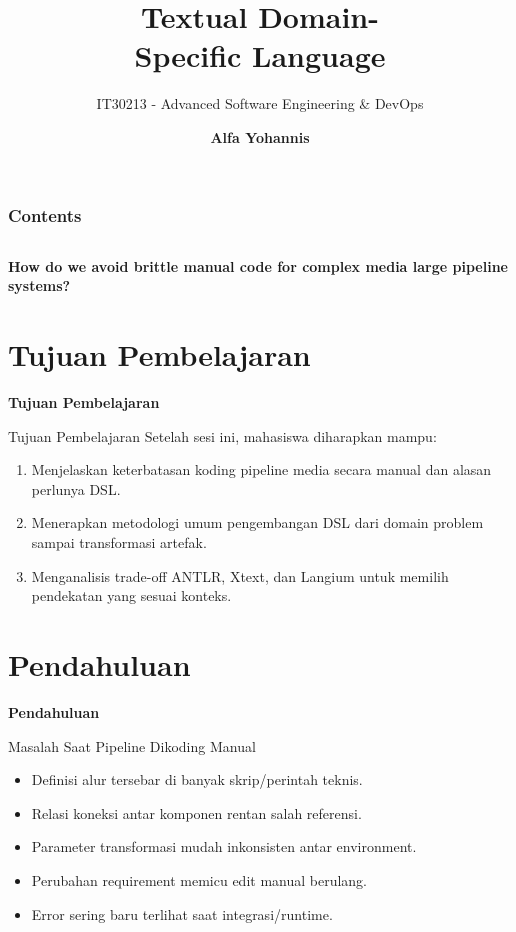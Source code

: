 \documentclass[aspectratio=169, table]{beamer}
\subtitle{IT30213 - Advanced Software Engineering \& DevOps}
\title{\Huge Textual Domain-\vspace{8pt}\\
	Specific Language}
\author{\textbf{Alfa Yohannis}}
\begin{document}
\frame{\titlepage}

\begin{frame}[fragile]
	\frametitle{Contents}
	\vspace{20pt}
	\begin{columns}[t]
		\tableofcontents[sections={1-5}]

		\tableofcontents[sections={6-9}]
	\end{columns}
\end{frame}

\begin{frame}{\hfill}
	\centering
	\Huge{\textbf{How do we avoid brittle manual code for complex media 
  large pipeline systems?}}
\end{frame}

\section{Tujuan Pembelajaran}
\begin{frame}{\hfill}
	\centering
	\Huge{\textbf{Tujuan Pembelajaran}}
\end{frame}

\begin{frame}{Tujuan Pembelajaran}
\vspace{6pt}
Setelah sesi ini, mahasiswa diharapkan mampu:
\begin{enumerate}
  \item Menjelaskan keterbatasan koding pipeline media secara manual dan alasan perlunya DSL.
  \item Menerapkan metodologi umum pengembangan DSL dari domain problem sampai transformasi artefak.
  \item Menganalisis trade-off ANTLR, Xtext, dan Langium untuk memilih pendekatan yang sesuai konteks.
\end{enumerate}
\end{frame}

\section{Pendahuluan}
\begin{frame}{\hfill}
	\centering
	\Huge{\textbf{Pendahuluan}}
\end{frame}

\begin{frame}{Masalah Saat Pipeline Dikoding Manual}
\vspace{6pt}
\begin{itemize}
  \item Definisi alur tersebar di banyak skrip/perintah teknis.
  \item Relasi koneksi antar komponen rentan salah referensi.
  \item Parameter transformasi mudah inkonsisten antar environment.
  \item Perubahan requirement memicu edit manual berulang.
  \item Error sering baru terlihat saat integrasi/runtime.
\end{itemize}
\end{frame}
\end{document}
